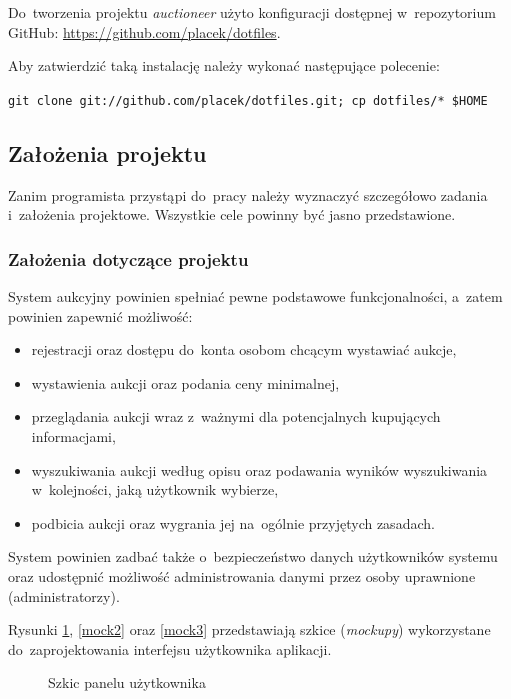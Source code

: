 Do~tworzenia projektu \textit{auctioneer} użyto konfiguracji dostępnej w~repozytorium GitHub: \url{https://github.com/placek/dotfiles}.


Aby zatwierdzić taką instalację należy wykonać następujące polecenie:


\texttt{git clone git://github.com/placek/dotfiles.git; cp dotfiles/* \$HOME}

\subsection{Założenia projektu}

Zanim programista przystąpi do~pracy należy wyznaczyć szczegółowo zadania i~założenia projektowe. Wszystkie cele powinny być jasno przedstawione.

\subsubsection{Założenia dotyczące projektu}

System aukcyjny powinien spełniać pewne podstawowe funkcjonalności, a~zatem powinien zapewnić możliwość:

\begin{itemize}
  \item rejestracji oraz dostępu do~konta osobom chcącym wystawiać aukcje,
  \item wystawienia aukcji oraz podania ceny minimalnej,
  \item przeglądania aukcji wraz z~ważnymi dla potencjalnych kupujących informacjami,
  \item wyszukiwania aukcji według opisu oraz podawania wyników wyszukiwania w~kolejności, jaką użytkownik wybierze,
  \item podbicia aukcji oraz wygrania jej na~ogólnie przyjętych zasadach.
\end{itemize}

System powinien zadbać także o~bezpieczeństwo danych użytkowników systemu oraz udostępnić możliwość administrowania danymi przez osoby uprawnione (administratorzy).


Rysunki \ref{mock1}, \ref{mock2} oraz \ref{mock3} przedstawiają szkice (\textit{mockupy}) wykorzystane do~zaprojektowania interfejsu użytkownika aplikacji.

\begin{figure}[h]
\centering
{}
\caption{Szkic panelu użytkownika}
\label{mock1}
\end{figure}

